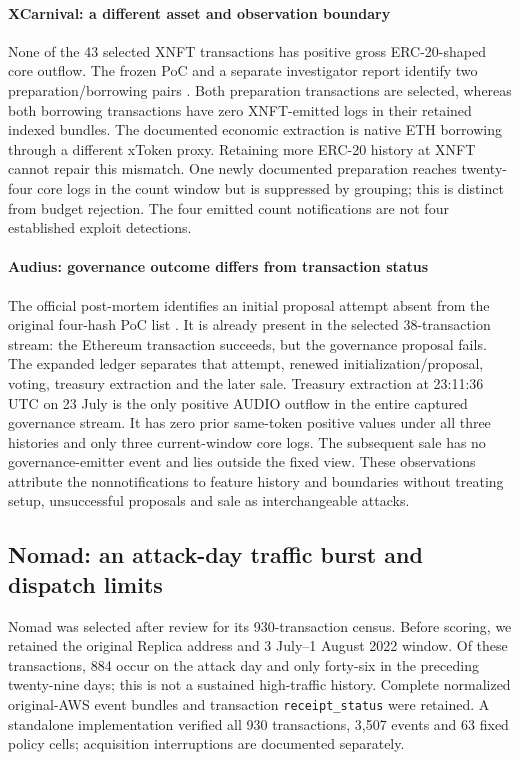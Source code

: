 \documentclass[preprint,12pt,authoryear]{elsarticle}
\begin{document}
\paragraph{XCarnival: a different asset and observation boundary}
None of the 43 selected XNFT transactions has positive gross ERC-20-shaped core outflow. The frozen PoC and a separate investigator report identify two preparation/borrowing pairs \citep{DeFiHackLabs2026,SlowMist2022XCarnival}. Both preparation transactions are selected, whereas both borrowing transactions have zero XNFT-emitted logs in their retained indexed bundles. The documented economic extraction is native ETH borrowing through a different xToken proxy. Retaining more ERC-20 history at XNFT cannot repair this mismatch. One newly documented preparation reaches twenty-four core logs in the count window but is suppressed by grouping; this is distinct from budget rejection. The four emitted count notifications are not four established exploit detections.

\paragraph{Audius: governance outcome differs from transaction status}
The official post-mortem identifies an initial proposal attempt absent from the original four-hash PoC list \citep{Audius2022Report}. It is already present in the selected 38-transaction stream: the Ethereum transaction succeeds, but the governance proposal fails. The expanded ledger separates that attempt, renewed initialization/proposal, voting, treasury extraction and the later sale. Treasury extraction at 23:11:36 UTC on 23 July is the only positive AUDIO outflow in the entire captured governance stream. It has zero prior same-token positive values under all three histories and only three current-window core logs. The subsequent sale has no governance-emitter event and lies outside the fixed view. These observations attribute the nonnotifications to feature history and boundaries without treating setup, unsuccessful proposals and sale as interchangeable attacks.

\subsection{Nomad: an attack-day traffic burst and dispatch limits}\label{sec:nomad}
Nomad was selected after review for its 930-transaction census. Before scoring, we retained the original Replica address and 3 July--1 August 2022 window. Of these transactions, 884 occur on the attack day and only forty-six in the preceding twenty-nine days; this is not a sustained high-traffic history. Complete normalized original-AWS event bundles and transaction \texttt{receipt\_status} were retained. A standalone implementation verified all 930 transactions, 3,507 events and 63 fixed policy cells; acquisition interruptions are documented separately.
\end{document}
